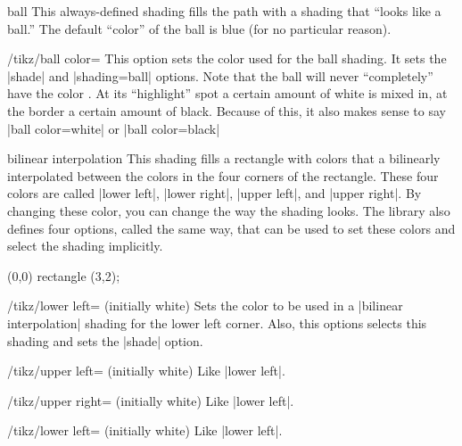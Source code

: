 \begin{shading}{ball}
  This always-defined shading fills the path with a shading that ``looks like a
  ball.'' The default ``color'' of the ball is blue (for no
  particular reason).

  \begin{key}{/tikz/ball color=}
    This option sets the color used for the ball shading. It sets the
    |shade| and |shading=ball| options. Note that the ball will never
    ``completely'' have the color . At its ``highlight'' spot
    a certain amount of white is mixed in, at the border a certain
    amount of black. Because of this, it also makes sense to say
    |ball color=white| or |ball color=black|

\begin{codeexample}[]
\end{codeexample}
  \end{key}
\end{shading}



\begin{shading}{bilinear interpolation}
  This shading fills a rectangle with colors that a bilinearly
  interpolated between the colors in the four corners of the
  rectangle. These four colors are called |lower left|, |lower right|,
  |upper left|, and |upper right|. By changing these color, you can
  change the way the shading looks. The library also defines four
  options, called the same way, that can be used to set these colors
  and select the shading implicitly.

\begin{codeexample}[]
\tikz
  \shade[upper left=red,upper right=green,
         lower left=blue,lower right=yellow]
    (0,0) rectangle (3,2);
\end{codeexample}

  \begin{key}{/tikz/lower left= (initially white)}
    Sets the color to be used in a |bilinear interpolation| shading
    for the lower left corner. Also, this options selects this shading
    and sets the |shade| option.
  \end{key}

  \begin{key}{/tikz/upper left= (initially white)}
    Like |lower left|.
  \end{key}
  \begin{key}{/tikz/upper right= (initially white)}
    Like |lower left|.
  \end{key}
  \begin{key}{/tikz/lower left= (initially white)}
    Like |lower left|.
  \end{key}
\end{shading}


